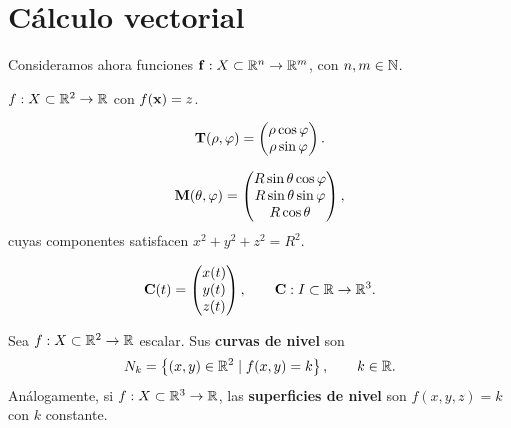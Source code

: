 \section{C\'alculo vectorial}
\label{sec:calculo_vectorial}

Consideramos ahora funciones
$\mathbf{f}:X\subset\mathbb{R}^n\rightarrow\mathbb{R}^m$, con $n,m\in\mathbb{N}$.

\begin{ejemplo}
  \label{ej:campo_escalar}
  $f:X\subset\mathbb{R}^2\rightarrow\mathbb{R}$ con $f(\mathbf{x})=z$.
\end{ejemplo}

\begin{ejemplo}
  \label{ej:transformacion}
  \begin{equation}
    \label{eq:transformacion_polar}
    \mathbf{T}(\rho,\varphi)=
    \begin{pmatrix}
      \rho\cos\varphi\\
      \rho\sin\varphi
    \end{pmatrix}.
  \end{equation}
\end{ejemplo}

\begin{ejemplo}
  \label{ej:superficie_esfera}
  \begin{equation}
    \label{eq:esfera_param}
    \mathbf{M}(\theta,\varphi)=
    \begin{pmatrix}
      R\sin\theta\cos\varphi\\
      R\sin\theta\sin\varphi\\
      R\cos\theta
    \end{pmatrix},
  \end{equation}
  cuyas componentes satisfacen $x^2+y^2+z^2=R^2$.
\end{ejemplo}

\begin{ejemplo}
  \label{ej:curva_R3}
  \begin{equation}
    \label{eq:curva_R3}
    \mathbf{C}(t)=
    \begin{pmatrix}
      x(t)\\y(t)\\z(t)
    \end{pmatrix},
    \qquad
    \mathbf{C}:I\subset\mathbb{R}\rightarrow\mathbb{R}^3 .
  \end{equation}
\end{ejemplo}

\begin{definicion}
  \label{def:curvas_nivel}
  Sea $f:X\subset\mathbb{R}^2\rightarrow\mathbb{R}$ escalar. Sus \textbf{curvas de nivel} son
  \begin{equation}
    \label{eq:curva_nivel}
    N_k=\left\{ (x,y)\in\mathbb{R}^2\mid f(x,y)=k \right\},
    \qquad k\in\mathbb{R} .
  \end{equation}
  An\'alogamente, si $f:X\subset\mathbb{R}^3\rightarrow\mathbb{R}$, las \textbf{superficies de
  nivel} son $f(x,y,z)=k$ con $k$ constante.
\end{definicion}


